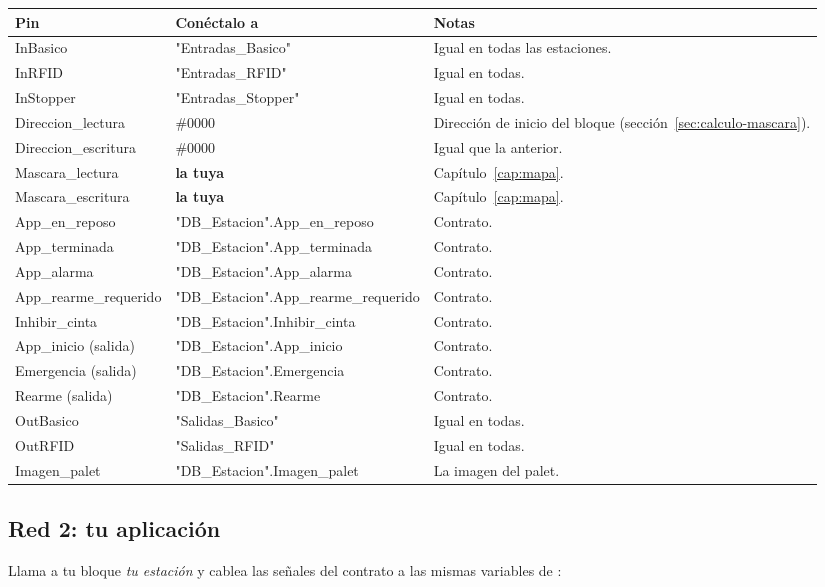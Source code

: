 \begin{center}
\footnotesize
\begin{tabularx}{\textwidth}{>{\ttfamily}p{3.5cm}>{\ttfamily}p{5.3cm}X}
\toprule
\textnormal{\textbf{Pin}} & \textnormal{\textbf{Conéctalo a}} & \textbf{Notas} \\
\midrule
InBasico & "Entradas\_Basico" & Igual en todas las estaciones. \\
InRFID & "Entradas\_RFID" & Igual en todas. \\
InStopper & "Entradas\_Stopper" & Igual en todas. \\
Direccion\_lectura & 16\#0000 & Dirección de inicio del bloque (sección~\ref{sec:calculo-mascara}). \\
Direccion\_escritura & 16\#0000 & Igual que la anterior. \\
Mascara\_lectura & \textbf{la tuya} & Capítulo~\ref{cap:mapa}. \\
Mascara\_escritura & \textbf{la tuya} & Capítulo~\ref{cap:mapa}. \\
App\_en\_reposo & "DB\_Estacion".App\_en\_reposo & Contrato. \\
App\_terminada & "DB\_Estacion".App\_terminada & Contrato. \\
App\_alarma & "DB\_Estacion".App\_alarma & Contrato. \\
App\_rearme\_requerido & "DB\_Estacion".App\_rearme\_requerido & Contrato. \\
Inhibir\_cinta & "DB\_Estacion".Inhibir\_cinta & Contrato. \\
App\_inicio (salida) & "DB\_Estacion".App\_inicio & Contrato. \\
Emergencia (salida) & "DB\_Estacion".Emergencia & Contrato. \\
Rearme (salida) & "DB\_Estacion".Rearme & Contrato. \\
OutBasico & "Salidas\_Basico" & Igual en todas. \\
OutRFID & "Salidas\_RFID" & Igual en todas. \\
Imagen\_palet & "DB\_Estacion".Imagen\_palet & La imagen del palet. \\
\bottomrule
\end{tabularx}
\end{center}

\subsection{Red 2: tu aplicación}
Llama a tu bloque \emph{tu estación} y cablea las señales del contrato a las mismas variables de :

